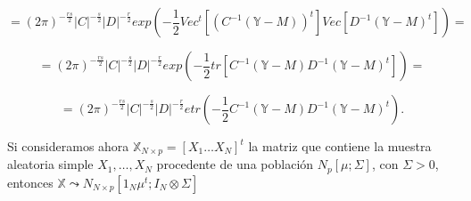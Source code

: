 \documentclass{article}
\theoremstyle{theorem-style}  %
\theoremstyle{definition-style}
\theoremstyle{example-style}
\theoremstyle{exercise-style}
\begin{document}
	$$ = (2\pi)^{-\frac{rs}{2}}|C|^{-\frac{s}{2}} |D|^{-\frac{r}{2}} exp(-\frac{1}{2} Vec^t[(C^{-1}(\mathbb{Y}-M))^t]Vec[D^{-1}(\mathbb{Y}-M)^t]) = $$
	
	$$ = (2\pi)^{-\frac{rs}{2}}|C|^{-\frac{s}{2}} |D|^{-\frac{r}{2}} exp(-\frac{1}{2} tr[C^{-1}(\mathbb{Y}-M)D^{-1}(\mathbb{Y}-M)^t]) = $$
	
	$$ = (2\pi)^{-\frac{rs}{2}}|C|^{-\frac{s}{2}} |D|^{-\frac{r}{2}} etr(-\frac{1}{2} C^{-1}(\mathbb{Y}-M)D^{-1}(\mathbb{Y}-M)^t). $$
	
	Si consideramos ahora $\mathbb{X}_{N\times p} = [X_1 \dots X_N]^t$ la matriz que contiene la muestra aleatoria simple $X_1, \dots, X_N$ procedente de una población $N_p[\mu; \Sigma]$, con $\Sigma>0$, entonces $\mathbb{X} \leadsto N_{N\times p}[1_N \mu^t; I_N \otimes \Sigma]$   
	
\end{document}
